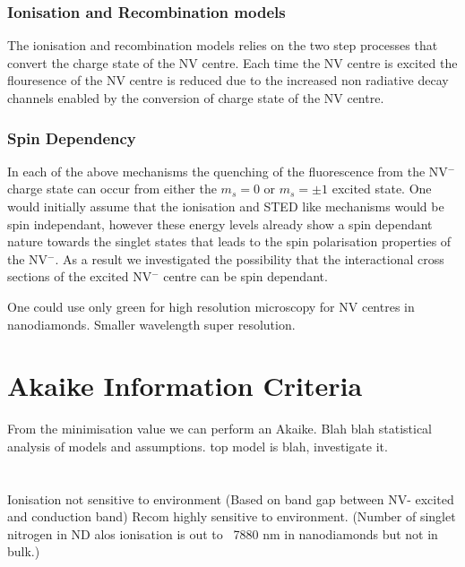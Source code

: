 \documentclass[prl]{revtex4}
\begin{document}
\subsubsection{Ionisation and Recombination models}
The ionisation and recombination models relies on the two step processes that convert the charge state of the NV centre. Each time the NV centre is excited the flouresence of the NV centre is reduced due to the increased non radiative decay channels enabled by the conversion of charge state of the NV centre.

\subsubsection{Spin Dependency}
In each of the above mechanisms the quenching of the fluorescence from the NV$^-$ charge state can occur from either the $m_s=0$ or $m_s=\pm1$ excited state. One would initially assume that the ionisation and STED like mechanisms would be spin independant, however these energy levels already show a spin dependant nature towards the singlet states that leads to the spin polarisation properties of the NV$^-$. As a result we investigated the possibility that the interactional cross sections of the excited NV$^-$ centre can be spin dependant.


One could use only green for high resolution microscopy for NV centres in nanodiamonds. Smaller wavelength super resolution.

\section{Akaike Information Criteria}
From the minimisation value we can perform an Akaike.
Blah blah statistical analysis of models and assumptions.
top model is blah, investigate it.
%

\section{}
Ionisation not sensitive to environment (Based on band gap between NV- excited and conduction band)
Recom highly sensitive to environment. (Number of singlet nitrogen in ND alos ionisation is out to ~7880 nm in nanodiamonds but not in bulk.)
\end{document}
